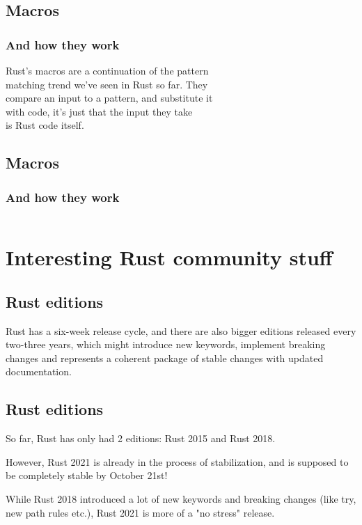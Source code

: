 \documentclass[usenames,twocolumn,dvipsnames,10pt,a4wide]{article}
\begin{document}
\subsection{Macros}
	\subsubsection{And how they work}
	Rust's macros are a continuation of the pattern\\
	matching trend we've seen in Rust so far. They\\
	compare an input to a pattern, and substitute it\\
	with code, it's just that the input they take\\
	is Rust code itself.
	

\subsection{Macros}
	\subsubsection{And how they work}
	\inputminted[fontsize=\normalsize]{rust}{code/macros3.rs}


\section{Interesting Rust community stuff}

\subsection{Rust editions}
	Rust has a six-week release cycle, and there are also
	bigger editions released every two-three years, which
	might introduce new keywords, implement breaking
	changes	and represents a coherent package of stable
	changes with updated documentation.



\subsection{Rust editions}
	So far, Rust has only had 2 editions: Rust 2015 and Rust 2018.

	
	
	However, Rust 2021 is already in the process of stabilization,
	and is supposed to be completely stable by October 21st!

	
	
	While Rust 2018 introduced a lot of new keywords and breaking
	changes (like try, 
	new path rules etc.), Rust 2021
	is more of a "no stress" release.
\end{document}

